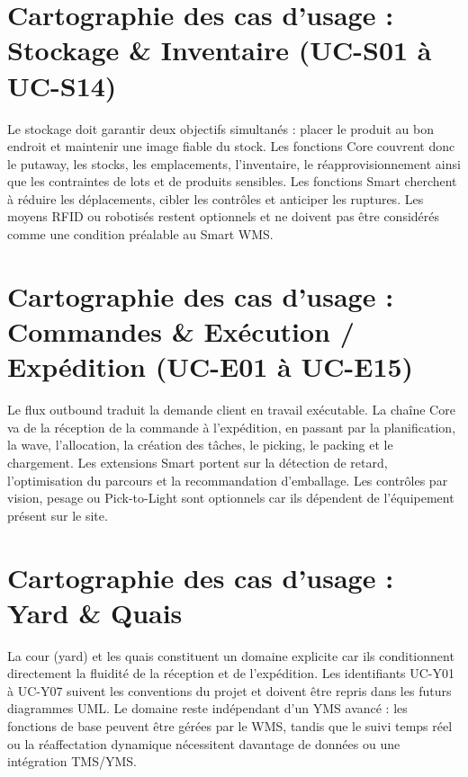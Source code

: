 


\section{Cartographie des cas d’usage  :  Stockage \& Inventaire (UC-S01 à UC-S14)}

\label{sec:3.4}

Le stockage doit garantir deux objectifs simultanés : placer le produit au bon endroit et maintenir une image fiable du stock. Les fonctions Core couvrent donc le putaway, les stocks, les emplacements, l’inventaire, le réapprovisionnement ainsi que les contraintes de lots et de produits sensibles. Les fonctions Smart cherchent à réduire les déplacements, cibler les contrôles et anticiper les ruptures. Les moyens RFID ou robotisés restent optionnels et ne doivent pas être considérés comme une condition préalable au Smart WMS.





\section{Cartographie des cas d’usage  :  Commandes \& Exécution / Expédition (UC-E01 à UC-E15)}

\label{sec:3.5}

Le flux outbound traduit la demande client en travail exécutable. La chaîne Core va de la réception de la commande à l’expédition, en passant par la planification, la wave, l’allocation, la création des tâches, le picking, le packing et le chargement. Les extensions Smart portent sur la détection de retard, l’optimisation du parcours et la recommandation d’emballage. Les contrôles par vision, pesage ou Pick-to-Light sont optionnels car ils dépendent de l’équipement présent sur le site.





\section{Cartographie des cas d’usage  :  Yard \& Quais}

\label{sec:3.6}

La cour (yard) et les quais constituent un domaine explicite car ils conditionnent directement la fluidité de la réception et de l’expédition. Les identifiants UC-Y01 à UC-Y07 suivent les conventions du projet et doivent être repris dans les futurs diagrammes UML. Le domaine reste indépendant d’un YMS avancé : les fonctions de base peuvent être gérées par le WMS, tandis que le suivi temps réel ou la réaffectation dynamique nécessitent davantage de données ou une intégration TMS/YMS.


